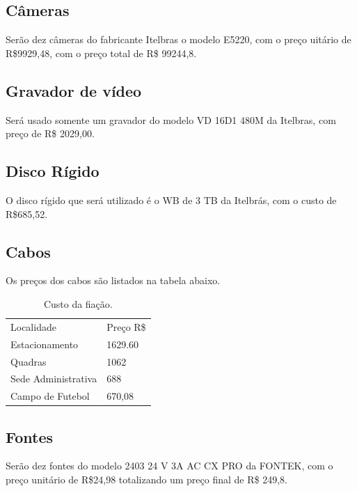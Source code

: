 \subsection{Câmeras}
Serão dez câmeras do fabricante Itelbras o modelo E5220, com o preço uitário de R\$9929,48, com o preço total de R\$ 99244,8.

\subsection{Gravador de vídeo}
Será usado somente um gravador do modelo VD 16D1 480M da Itelbras, com preço de R\$ 2029,00.

\subsection{Disco Rígido}
O disco rígido que será utilizado é o WB de 3 TB da Itelbrás,  com o custo de R\$685,52.

\subsection{Cabos}
Os preços dos cabos são listados na tabela abaixo. 

\begin{table}[h]
\centering
\caption{Custo da fiação.}
\label{Custo da fiação}
\begin{tabular}{lll}
 &  &  \\ \hline
\multicolumn{1}{|l|}{Localidade} & \multicolumn{2}{l|}{Preço R\$} \\ \hline
\multicolumn{1}{|l|}{Estacionamento} & \multicolumn{2}{l|}{1629.60} \\ \hline
\multicolumn{1}{|l|}{Quadras} & \multicolumn{2}{l|}{1062} \\ \hline
\multicolumn{1}{|l|}{Sede Administrativa} & \multicolumn{2}{l|}{688} \\ \hline
\multicolumn{1}{|l|}{Campo de Futebol} & \multicolumn{2}{l|}{670,08} \\ \hline
\end{tabular}
\end{table}

\subsection{Fontes}

Serão dez fontes do modelo 2403 24 V 3A AC CX PRO da FONTEK, com o preço unitário de R\$24,98 totalizando um preço final de R\$ 249,8.

